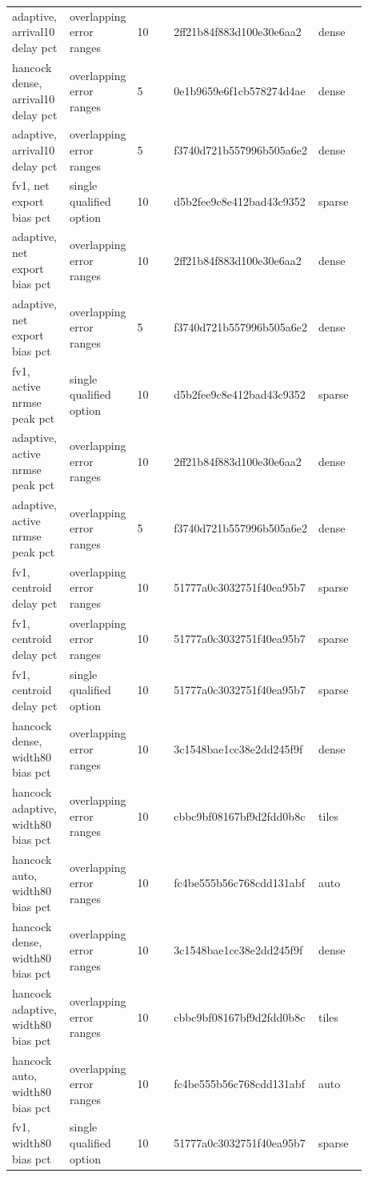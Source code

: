 \begin{longtable}{p{0.1760\linewidth}p{0.1760\linewidth}p{0.1760\linewidth}p{0.1760\linewidth}p{0.1760\linewidth}}
adaptive, arrival10 delay pct & overlapping error ranges & 10 & 2ff21b84f883d100e30e6aa2 & dense \\
hancock dense, arrival10 delay pct & overlapping error ranges & 5 & 0e1b9659e6f1cb578274d4ae & dense \\
adaptive, arrival10 delay pct & overlapping error ranges & 5 & f3740d721b557996b505a6e2 & dense \\
fv1, net export bias pct & single qualified option & 10 & d5b2fee9c8e412bad43c9352 & sparse \\
adaptive, net export bias pct & overlapping error ranges & 10 & 2ff21b84f883d100e30e6aa2 & dense \\
adaptive, net export bias pct & overlapping error ranges & 5 & f3740d721b557996b505a6e2 & dense \\
fv1, active nrmse peak pct & single qualified option & 10 & d5b2fee9c8e412bad43c9352 & sparse \\
adaptive, active nrmse peak pct & overlapping error ranges & 10 & 2ff21b84f883d100e30e6aa2 & dense \\
adaptive, active nrmse peak pct & overlapping error ranges & 5 & f3740d721b557996b505a6e2 & dense \\
fv1, centroid delay pct & overlapping error ranges & 10 & 51777a0c3032751f40ea95b7 & sparse \\
fv1, centroid delay pct & overlapping error ranges & 10 & 51777a0c3032751f40ea95b7 & sparse \\
fv1, centroid delay pct & single qualified option & 10 & 51777a0c3032751f40ea95b7 & sparse \\
hancock dense, width80 bias pct & overlapping error ranges & 10 & 3c1548bae1cc38e2dd245f9f & dense \\
hancock adaptive, width80 bias pct & overlapping error ranges & 10 & cbbc9bf08167bf9d2fdd0b8c & tiles \\
hancock auto, width80 bias pct & overlapping error ranges & 10 & fc4be555b56c768cdd131abf & auto \\
hancock dense, width80 bias pct & overlapping error ranges & 10 & 3c1548bae1cc38e2dd245f9f & dense \\
hancock adaptive, width80 bias pct & overlapping error ranges & 10 & cbbc9bf08167bf9d2fdd0b8c & tiles \\
hancock auto, width80 bias pct & overlapping error ranges & 10 & fc4be555b56c768cdd131abf & auto \\
fv1, width80 bias pct & single qualified option & 10 & 51777a0c3032751f40ea95b7 & sparse \\

\end{longtable}
